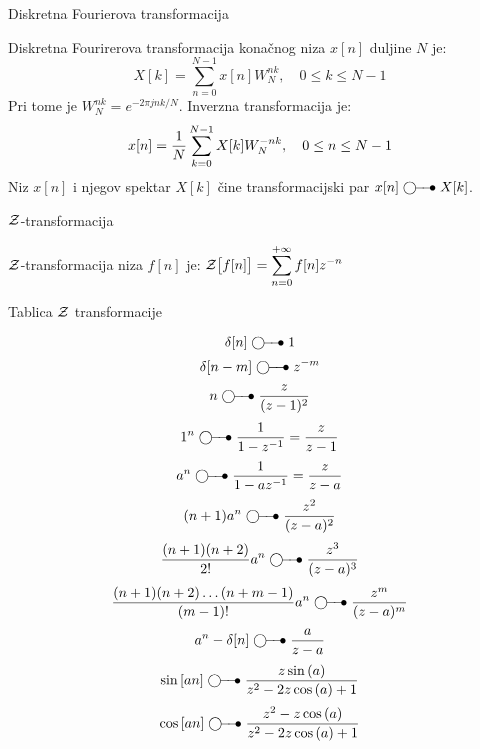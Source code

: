 \dio Diskretna Fourierova transformacija

Diskretna Fourirerova transformacija kona\v cnog niza $x[n]$ duljine $N$ je:
$$X[k]=\sum_{n=0}^{N-1}x[n]W^{nk}_N,\quad 0\le k\le N-1$$
Pri tome je $W^{nk}_N=e^{-2\pi jnk/N}$.
Inverzna transformacija je:
$$x[n]={1\over N}\sum_{k=0}^{N-1}X[k]W^{-nk}_N,\quad 0\le n\le N-1$$
Niz $x[n]$ i njegov spektar $X[k]$ \v cine transformacijski par
$x[n]\ufrek X[k]$.


\dio $\cal Z$-transformacija

$\cal Z$-transformacija niza $f[n]$ je:
$\strut\displaystyle {\cal Z} \bigl[f[n]\bigr] = \sum _{n=0}^{+\infty} f[n] z^{-n}$

\poddio Tablica $\cal Z$ transformacije

$$ \delta [n] \ufrek 1 $$
$$ \delta [n-m] \ufrek z^{-m} $$
$$ n \ufrek {z\over (z-1)^2}$$
$$ {1^n}\ufrek {{1}\over {1-z^{-1}}} = {{z}\over {z-1}}$$
$$ {a^n}\ufrek {{1}\over {1-az^{-1}}} = {{z}\over {z-a}} $$
$$ (n+1)a^n\ufrek {{z^2}\over {(z-a)^2}} $$
$$ {(n+1)(n+2)\over 2!}a^n \ufrek {z^3\over(z-a)^3}$$
$$ {{{(n+1)(n+2)\dots (n+m-1)}\over {(m-1)!}} a^n}\ufrek {{z^m}\over {(z-a)^m}} $$
$$ {a^n - \delta [n]}\ufrek{a\over {z - a}}$$
$$ {\sin {[an]}}\ufrek {{z \sin {(a)}}\over {z^2 - 2z \cos {(a)} + 1}} $$
$$ {\cos {[an]}}\ufrek {{z^2 - z \cos {(a)}}\over {z^2 - 2z \cos {(a)} + 1}} $$

\bye


